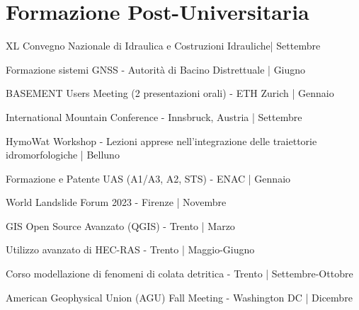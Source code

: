 
\section{Formazione Post-Universitaria}

 XL Convegno Nazionale di Idraulica e Costruzioni Idrauliche| Settembre
\sectionsep

 Formazione sistemi GNSS - Autorità di Bacino Distrettuale | Giugno
\sectionsep

 BASEMENT Users Meeting (2 presentazioni orali) - ETH Zurich | Gennaio
\sectionsep

 International Mountain Conference - Innsbruck, Austria | Settembre
\sectionsep

 HymoWat Workshop - Lezioni apprese nell'integrazione delle traiettorie idromorfologiche | Belluno
\sectionsep

\sectionsep

 Formazione e Patente UAS (A1/A3, A2, STS) - ENAC | Gennaio
\sectionsep

 World Landslide Forum 2023 - Firenze | Novembre
\sectionsep

\sectionsep

\sectionsep

 GIS Open Source Avanzato (QGIS) - Trento | Marzo
\sectionsep

\sectionsep

\sectionsep

\sectionsep

 Utilizzo avanzato di HEC-RAS - Trento | Maggio-Giugno
\sectionsep

 Corso modellazione di fenomeni di colata detritica - Trento | Settembre-Ottobre
\sectionsep

 American Geophysical Union (AGU) Fall Meeting - Washington DC | Dicembre
\sectionsep

